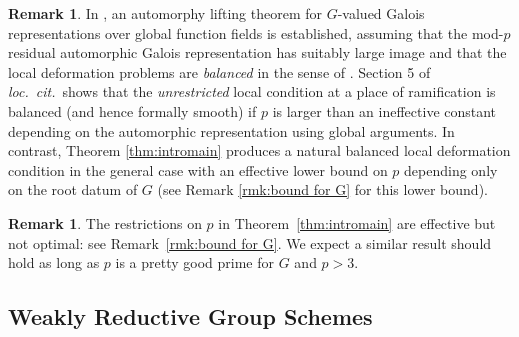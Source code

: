 \documentclass[11pt, letterpaper,english]{amsart}
\theoremstyle{plain}
\theoremstyle{definition}
\newtheorem{remark}[lem]{Remark}
\numberwithin{equation}{section}
\numberwithin{lem}{section}
\begin{document}
\begin{remark} \label{remark:automorphic} 
%
In \cite[Section 4.3]{boeckle-cyclic}, an automorphy lifting theorem for $G$-valued Galois representations over global function fields is established, assuming that the mod-$p$ residual automorphic Galois representation has suitably large image and that the local deformation problems are \emph{balanced} in the sense of \cite[Definition 3.4]{boeckle-cyclic}.
%
Section 5 of \emph{loc.}\ \emph{cit.}\ shows that the \emph{unrestricted} local condition at a place of ramification is balanced (and hence formally smooth) if $p$ is larger than an ineffective constant depending on the automorphic representation using global arguments. In contrast, Theorem \ref{thm:intromain} produces a natural balanced local deformation condition in the general case with an effective lower bound on $p$ depending only on the root datum of $G$ (see Remark \ref{rmk:bound for G} for this lower bound). 
%
\end{remark}

\begin{remark}
    The restrictions on $p$ in Theorem~\ref{thm:intromain} are effective but not optimal: see Remark~\ref{rmk:bound for G}.  We expect a similar result should hold as long as $p$ is a pretty good prime for $G$ and $p > 3$.
\end{remark}

\subsection{Weakly Reductive Group Schemes} \label{ss:weakly-reductive}
\end{document}
